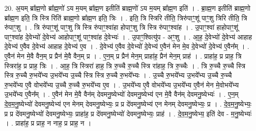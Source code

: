 \documentclass[17pt]{extarticle}
\begin{document}
20. अ॒यम् ब्रा᳚ह्म॒णो ब्रा᳚ह्म॒णो॑ ऽय म॒यम् ब्रा᳚ह्म॒ण इतीति॑ ब्राह्म॒णो॑ ऽय म॒यम् ब्रा᳚ह्म॒ण इति॑ । . ब्रा॒ह्म॒ण इतीति॑ ब्राह्म॒णो ब्रा᳚ह्म॒ण इति॒ त्रि स्त्रि रिति॑ ब्राह्म॒णो ब्रा᳚ह्म॒ण इति॒ त्रिः । . इति॒ त्रि स्त्रिरि तीति॒ त्रिरु॑पाꣳ॒॒शू॑ पाꣳ॒॒शु त्रिरि तीति॒ त्रि रु॑पाꣳ॒॒शु । . त्रि रु॑पाꣳ॒॒शू॑ पाꣳ॒॒शु त्रि स्त्रि रु॑पाꣳ॒॒श्वा॑हा होपाꣳ॒॒शु त्रि स्त्रि रु॑पाꣳ॒॒श्वा॑ह । . उ॒पाꣳ॒॒श्वा॑ हाहोपाꣳ॒॒शू॑ पाꣳ॒॒श्वा॑ह दे॒वेभ्यो॑ दे॒वेभ्य॑ आहोपाꣳ॒॒शू॑ पाꣳ॒॒श्वा॑ह दे॒वेभ्यः॑ । . उ॒पाꣳ॒॒श्वित्यु॑प - अꣳ॒॒शु । . आ॒ह॒ दे॒वेभ्यो॑ दे॒वेभ्य॑ आहाह दे॒वेभ्य॑ ए॒वैव दे॒वेभ्य॑ आहाह दे॒वेभ्य॑ ए॒व । . दे॒वेभ्य॑ ए॒वैव दे॒वेभ्यो॑ दे॒वेभ्य॑ ए॒वैन॑ मेन मे॒व दे॒वेभ्यो॑ दे॒वेभ्य॑ ए॒वैन᳚म् । . ए॒वैन॑ मेन मे॒वै वैन॒म् प्र प्रैन॑ मे॒वै वैन॒म् प्र । . ए॒न॒म् प्र प्रैन॑ मेन॒म् प्राहा॑ह॒ प्रैन॑ मेन॒म् प्राह॑ । . प्राहा॑ह॒ प्र प्राह॒ त्रि स्त्रिरा॑ह॒ प्र प्राह॒ त्रिः । . आ॒ह॒ त्रि स्त्रिरा॑ हाह॒ त्रि रु॒च्चै रु॒च्चै स्त्रि रा॑हाह॒ त्रि रु॒च्चैः । . त्रि रु॒च्चै रु॒च्चै स्त्रि स्त्रि रु॒च्चै रु॒भये᳚भ्य उ॒भये᳚भ्य उ॒च्चै स्त्रि स्त्रि रु॒च्चै रु॒भये᳚भ्यः । . उ॒च्चै रु॒भये᳚भ्य उ॒भये᳚भ्य उ॒च्चै रु॒च्चै रु॒भये᳚भ्य ए॒वै वोभये᳚भ्य उ॒च्चै रु॒च्चै रु॒भये᳚भ्य ए॒व । . उ॒भये᳚भ्य ए॒वै वोभये᳚भ्य उ॒भये᳚भ्य ए॒वैन॑ मेन मे॒वोभये᳚भ्य उ॒भये᳚भ्य ए॒वैन᳚म् । . ए॒वैन॑ मेन मे॒वै वैन॑म् देवमनु॒ष्येभ्यो॑ देवमनु॒ष्येभ्य॑ एन मे॒वै वैन॑म् देवमनु॒ष्येभ्यः॑ । . ए॒न॒म् दे॒व॒म॒नु॒ष्येभ्यो॑ देवमनु॒ष्येभ्य॑ एन मेनम् देवमनु॒ष्येभ्यः॒ प्र प्र दे॑वमनु॒ष्येभ्य॑ एन मेनम् देवमनु॒ष्येभ्यः॒ प्र । . दे॒व॒म॒नु॒ष्येभ्यः॒ प्र प्र दे॑वमनु॒ष्येभ्यो॑ देवमनु॒ष्येभ्यः॒ प्राहा॑ह॒ प्र दे॑वमनु॒ष्येभ्यो॑ देवमनु॒ष्येभ्यः॒ प्राह॑ । . दे॒व॒म॒नु॒ष्येभ्य॒ इति॑ देव - म॒नु॒ष्येभ्यः॑ । . प्राहा॑ह॒ प्र प्राह॒ न नाह॒ प्र प्राह॒ न । \newline
\end{document}
